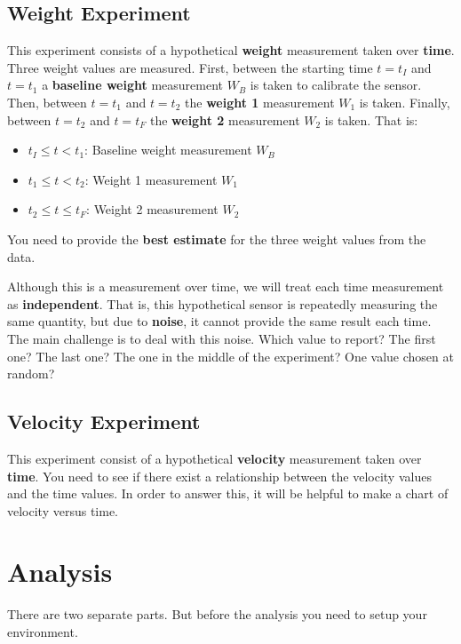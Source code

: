 \subsection{Weight Experiment}
This experiment consists of a hypothetical \textbf{weight} measurement taken over \textbf{time}. Three weight values are measured. First, between the starting time $t = t_{I}$ and $t = t_{1}$ a \textbf{baseline weight} measurement $W_{B}$ is taken to calibrate the sensor. Then, between $t = t_{1}$ and $t = t_{2}$ the \textbf{weight 1} measurement $W_{1}$ is taken. Finally, between $t = t_{2}$ and $t = t_{F}$ the \textbf{weight 2} measurement $W_{2}$ is taken. That is:
\begin{itemize}
    \item $t_{I} \leq t < t_{1}$: Baseline weight measurement $W_{B}$
    \item $t_{1} \leq t < t_{2}$: Weight 1 measurement $W_{1}$
    \item $t_{2} \leq t \leq t_{F}$: Weight 2 measurement $W_{2}$
\end{itemize}
You need to provide the \textbf{best estimate} for the three weight values from the data.

Although this is a measurement over time, we will treat each time measurement as \textbf{independent}. That is, this hypothetical sensor is repeatedly measuring the same quantity, but due to \textbf{noise}, it cannot provide the same result each time. The main challenge is to deal with this noise. Which value to report? The first one? The last one? The one in the middle of the experiment? One value chosen at random?
\subsection{Velocity Experiment}
This experiment consist of a hypothetical \textbf{velocity} measurement taken over \textbf{time}. You need to see if there exist a relationship between the velocity values and the time values. In order to answer this, it will be helpful to make a chart of velocity versus time.
\section{Analysis}
There are two separate parts. But before the analysis you need to setup your environment.
